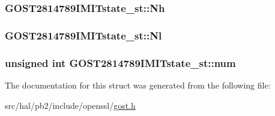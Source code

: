 \subsubsection[{\texorpdfstring{Nh}{Nh}}]{ G\+O\+S\+T2814789\+I\+M\+I\+Tstate\+\_\+st\+::\+Nh}\hypertarget{struct_g_o_s_t2814789_i_m_i_tstate__st_add0b3a60c8a27d2a9b8836495860fdf1}{}\label{struct_g_o_s_t2814789_i_m_i_tstate__st_add0b3a60c8a27d2a9b8836495860fdf1}
\subsubsection[{\texorpdfstring{Nl}{Nl}}]{ G\+O\+S\+T2814789\+I\+M\+I\+Tstate\+\_\+st\+::\+Nl}\hypertarget{struct_g_o_s_t2814789_i_m_i_tstate__st_ad36394135c21dfe25d7173c0849490d1}{}\label{struct_g_o_s_t2814789_i_m_i_tstate__st_ad36394135c21dfe25d7173c0849490d1}
\subsubsection[{\texorpdfstring{num}{num}}]{\setlength{\rightskip}{0pt plus 5cm}unsigned int G\+O\+S\+T2814789\+I\+M\+I\+Tstate\+\_\+st\+::num}\hypertarget{struct_g_o_s_t2814789_i_m_i_tstate__st_aa8f628382ebf8fab9ba584a8e6355b29}{}\label{struct_g_o_s_t2814789_i_m_i_tstate__st_aa8f628382ebf8fab9ba584a8e6355b29}


The documentation for this struct was generated from the following file\+:\begin{DoxyCompactItemize}
\item 
src/hal/pb2/include/openssl/\hyperlink{gost_8h}{gost.\+h}\end{DoxyCompactItemize}
